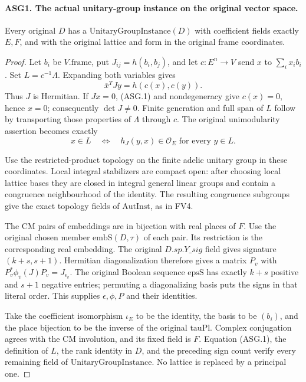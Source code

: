 \documentclass[11pt,a4paper]{article}
\numberwithin{equation}{section}
\theoremstyle{remark}\newtheorem{remark}[theorem]{Remark}
\begin{document}
\paragraph{ASG1. The actual unitary-group instance on the original vector space.}
\label{claim:ASG1}
Every original \(D\) has a \(\mathrm{UnitaryGroupInstance}(D)\)
with coefficient fields exactly \(E,F\), and with the original lattice
and form in the original frame coordinates.
\begin{proof}
Let \(b_i\) be \(V.\mathrm{frame}\), put
\(J_{ij}=h(b_i,b_j)\), and let
\(c:E^n\longrightarrow V\) send \(x\) to \(\sum_i x_i b_i\).
Set \(L=c^{-1}\Lambda\).  Expanding both variables gives
\[
                 \overline{x}^{T}Jy=h(c(x),c(y)).
\tag{ASG.1}
\]
Thus \(J\) is Hermitian.  If \(Jx=0\), (ASG.1) and
nondegeneracy give \(c(x)=0\), hence \(x=0\); consequently
\(\det J\ne0\).  Finite generation and full span of \(L\)
follow by transporting those properties of \(\Lambda\) through
\(c\).  The original unimodularity assertion becomes exactly
\[
 x\in L\quad\Longleftrightarrow\quad
       h_J(y,x)\in\mathcal O_E\text{ for every }y\in L.
\tag{ASG.2}
\]

Use the restricted-product topology on the finite adelic unitary group
in these coordinates.  Local integral stabilizers are compact open:
after choosing local lattice bases they are closed in integral general
linear groups and contain a congruence neighbourhood of the identity.
The resulting congruence subgroups give the exact topology fields of
\(\mathrm{AutInst}\), as in FV4.

The CM pairs of embeddings are in bijection with real places of \(F\).
Use the original chosen member \(\mathrm{embS}(D,\tau)\) of each
pair.  Its restriction is the corresponding real embedding.  The
original \(D.sp.Y\_\allowbreak sig\) field gives signature
\((k+s,s+1)\).  Hermitian diagonalization therefore gives a matrix
\(P_v\) with
\(P_v^*\phi_v(J)P_v=J_{\epsilon_v}\).
The original Boolean sequence \(\mathrm{epsS}\) has exactly
\(k+s\) positive and \(s+1\) negative entries; permuting a
diagonalizing basis puts the signs in that literal order.
This supplies \(\epsilon,\phi,P\) and their identities.

Take the coefficient isomorphism \(\iota_E\) to be the identity,
the basis to be \((b_i)\), and the place bijection to be the inverse
of the original \(\mathrm{tauPl}\).  Complex conjugation agrees
with the CM involution, and its fixed field is \(F\).
Equation (ASG.1), the definition of \(L\), the rank identity in
\(D\), and the preceding sign count verify every remaining field
of \(\mathrm{UnitaryGroupInstance}\).  No lattice is replaced
by a principal one.
\end{proof}
\end{document}
